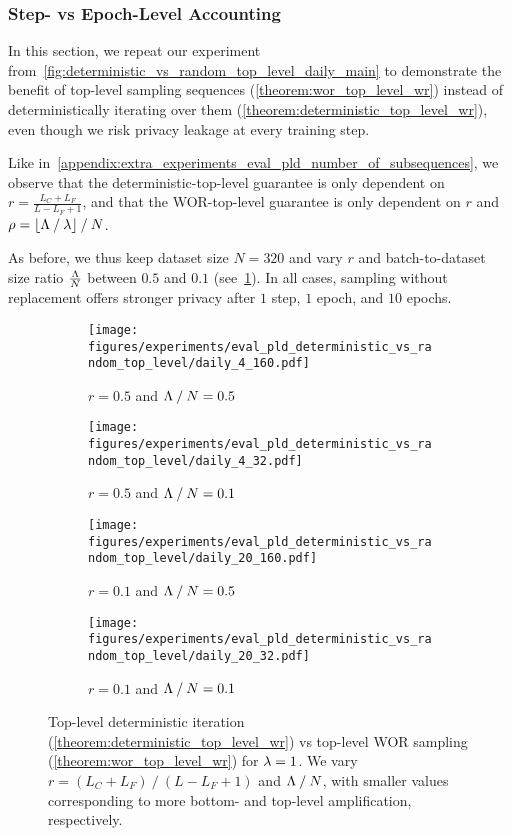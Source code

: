 \clearpage

\subsubsection{Step- vs Epoch-Level Accounting}
In this section, we repeat our experiment from~\cref{fig:deterministic_vs_random_top_level_daily_main}
to demonstrate  the benefit of top-level sampling sequences (\cref{theorem:wor_top_level_wr}) instead of deterministically iterating over them (\cref{theorem:deterministic_top_level_wr}), even though we risk privacy leakage at every training step.

Like in~\cref{appendix:extra_experiments_eval_pld_number_of_subsequences},
we observe that the deterministic-top-level guarantee is only dependent
on 
$r = \frac{L_C + L_F}{L - L_F + 1}$,
and that the WOR-top-level guarantee is only dependent on $r$ and 
$\rho = \lfloor \Lambda \mathbin{/} \lambda \rfloor \mathbin{/} N$.

As before, we thus keep dataset size $N=320$ and vary
$r$ and batch-to-dataset size ratio $\frac{\Lambda}{N}$ between $0.5$ and $0.1$ (see~\cref{fig:deterministic_vs_random_top_level_daily_appendix}).
In all cases, sampling without replacement offers stronger privacy after $1$ step, $1$ epoch, and $10$ epochs.


\begin{figure*}[h!]
\centering
\vskip 0.2in
    \begin{subfigure}{0.49\textwidth}
        \texttt{[image: figures/experiments/eval\_pld\_deterministic\_vs\_random\_top\_level/daily\_4\_160.pdf]}
        \caption{$r = 0.5$ and $\Lambda \mathbin{/} N = 0.5$}
    \end{subfigure}
    \hfill
    \begin{subfigure}{0.49\textwidth}
        \texttt{[image: figures/experiments/eval\_pld\_deterministic\_vs\_random\_top\_level/daily\_4\_32.pdf]}
        \caption{$r = 0.5$ and $\Lambda \mathbin{/} N = 0.1$}
    \end{subfigure}
    \begin{subfigure}{0.49\textwidth}
        \texttt{[image: figures/experiments/eval\_pld\_deterministic\_vs\_random\_top\_level/daily\_20\_160.pdf]}
        \caption{$r = 0.1$ and $\Lambda \mathbin{/} N = 0.5$}
    \end{subfigure}
    \hfill
    \begin{subfigure}{0.49\textwidth}
        \texttt{[image: figures/experiments/eval\_pld\_deterministic\_vs\_random\_top\_level/daily\_20\_32.pdf]}
        \caption{$r = 0.1$ and $\Lambda \mathbin{/} N = 0.1$
        }
    \end{subfigure}
    \caption{Top-level deterministic iteration (\cref{theorem:deterministic_top_level_wr}) vs top-level WOR sampling (\cref{theorem:wor_top_level_wr}) for $\lambda=1$.
        We vary $r = (L_C + L_F) \mathbin{/} (L - L_F + 1)$
        and $\Lambda \mathbin{/} N$,
        with smaller values corresponding to more bottom- and top-level amplification, respectively.}
    \label{fig:deterministic_vs_random_top_level_daily_appendix}
\vskip -0.2in
\end{figure*}


